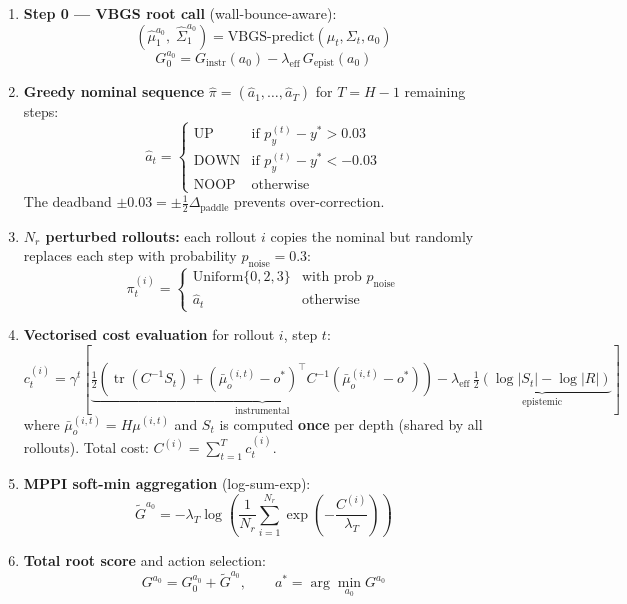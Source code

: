 \documentclass[12pt, a4paper]{article}
\newcommand{\1}{\mathbf{1}}
\newcommand{\tr}{\operatorname{tr}}
\begin{document}
\begin{enumerate}
\item \textbf{Step 0 --- VBGS root call} (wall-bounce-aware):
\[
(\hat\mu_1^{a_0},\; \hat\Sigma_1^{a_0})
= \text{VBGS-predict}(\mu_t, \Sigma_t, a_0)
\]
\[
G_0^{a_0} = G_\text{instr}(a_0) - \lambda_\text{eff}\, G_\text{epist}(a_0)
\]

\item \textbf{Greedy nominal sequence}
$\hat\pi = (\hat a_1, \ldots, \hat a_{T})$ for $T = H-1$ remaining steps:
\[
\hat a_t = \begin{cases}
\text{UP}   & \text{if } p_y^{(t)} - y^* > 0.03 \\
\text{DOWN} & \text{if } p_y^{(t)} - y^* < -0.03 \\
\text{NOOP} & \text{otherwise}
\end{cases}
\]
The deadband $\pm 0.03 = \pm\frac{1}{2} \Delta_\text{paddle}$ prevents
over-correction.

\item \textbf{$N_r$ perturbed rollouts:} each rollout $i$ copies the nominal but
  randomly replaces each step with probability $p_\text{noise} = 0.3$:
\[
\pi^{(i)}_t = \begin{cases}
\text{Uniform}\{0,2,3\} & \text{with prob } p_\text{noise} \\
\hat a_t               & \text{otherwise}
\end{cases}
\]

\item \textbf{Vectorised cost evaluation} for rollout $i$, step $t$:
\[
c^{(i)}_t = \gamma^t \left[
  \underbrace{
    \tfrac{1}{2}\!\left(
      \tr(C^{-1} S_t)
      + (\bar\mu_o^{(i,t)} - o^*)^\top C^{-1} (\bar\mu_o^{(i,t)} - o^*)
    \right)
  }_{\text{instrumental}}
  - \lambda_\text{eff}\,
  \underbrace{
    \tfrac{1}{2}(\log|S_t| - \log|R|)
  }_{\text{epistemic}}
  \right]
\]
where $\bar\mu_o^{(i,t)} = H\mu^{(i,t)}$ and $S_t$ is computed \textbf{once} per
depth (shared by all rollouts).  Total cost: $C^{(i)} = \sum_{t=1}^{T} c^{(i)}_t$.

\item \textbf{MPPI soft-min aggregation} (log-sum-exp):
\[
\tilde G^{a_0}
= -\lambda_T \log\!\left(
    \frac{1}{N_r}\sum_{i=1}^{N_r}
    \exp\!\left(-\frac{C^{(i)}}{\lambda_T}\right)
  \right)
\]

\item \textbf{Total root score} and action selection:
\[
G^{a_0} = G_0^{a_0} + \tilde G^{a_0},
\qquad
a^* = \arg\min_{a_0} G^{a_0}
\]
\end{enumerate}
\end{document}
